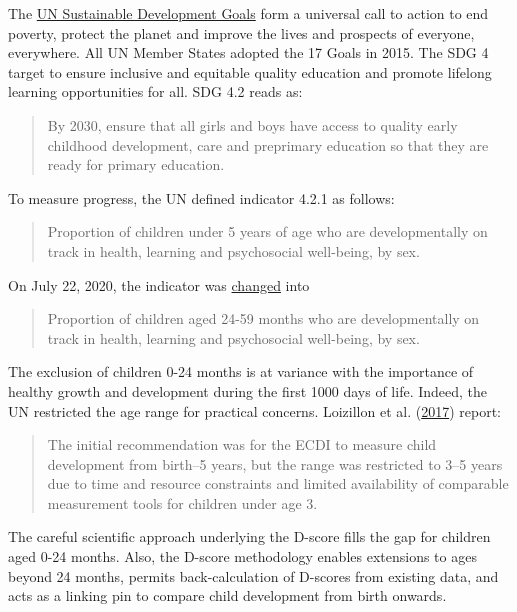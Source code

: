 \documentclass[
]{book}
\begin{document}
The \href{https://www.un.org/sustainabledevelopment/development-agenda/}{UN Sustainable Development Goals} form a universal call to action to end poverty, protect the planet and improve the lives and prospects of everyone, everywhere. All UN Member States adopted the 17 Goals in 2015. The SDG 4 target to ensure inclusive and equitable quality education and promote lifelong learning opportunities for all. SDG 4.2 reads as:

\begin{quote}
By 2030, ensure that all girls and boys have access to quality early childhood development, care and preprimary education so that they are ready for primary education.
\end{quote}

To measure progress, the UN defined indicator 4.2.1 as follows:

\begin{quote}
Proportion of children under 5 years of age who are developmentally on track in health, learning and psychosocial well-being, by sex.
\end{quote}

On July 22, 2020, the indicator was \href{https://unstats.un.org/sdgs/metadata/}{changed} into

\begin{quote}
Proportion of children aged 24-59 months who are developmentally on track in health, learning and psychosocial well-being, by sex.
\end{quote}

The exclusion of children 0-24 months is at variance with the importance of healthy growth and development during the first 1000 days of life. Indeed, the UN restricted the age range for practical concerns. Loizillon et al. (\protect\hyperlink{ref-loizillon2017}{2017}) report:

\begin{quote}
The initial recommendation was for the ECDI to measure child development from birth--5 years, but the range was restricted to 3--5 years due to time and resource constraints and limited availability of comparable measurement tools for children under age 3.
\end{quote}

The careful scientific approach underlying the D-score fills the gap for children aged 0-24 months. Also, the D-score methodology enables extensions to ages beyond 24 months, permits back-calculation of D-scores from existing data, and acts as a linking pin to compare child development from birth onwards.
\end{document}
